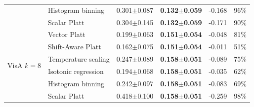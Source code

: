 \begin{table}[pos=t]
\begin{tabular}{llrrrr}
 & Histogram binning & 0.301$\pm$0.087 & \textbf{0.132$\pm$0.059} & -0.168 & 96\% \\
 & Scalar Platt & 0.304$\pm$0.145 & \textbf{0.132$\pm$0.059} & -0.171 & 90\% \\
\midrule
\multirow{6}{*}{VisA $k{=}8$} & Vector Platt & 0.199$\pm$0.063 & \textbf{0.151$\pm$0.054} & -0.048 & 81\% \\
 & Shift-Aware Platt & 0.162$\pm$0.075 & \textbf{0.151$\pm$0.054} & -0.011 & 51\% \\
 & Temperature scaling & 0.247$\pm$0.089 & \textbf{0.158$\pm$0.051} & -0.089 & 75\% \\
 & Isotonic regression & 0.194$\pm$0.068 & \textbf{0.158$\pm$0.051} & -0.035 & 62\% \\
 & Histogram binning & 0.242$\pm$0.097 & \textbf{0.158$\pm$0.051} & -0.083 & 69\% \\
 & Scalar Platt & 0.418$\pm$0.100 & \textbf{0.158$\pm$0.051} & -0.259 & 98\% \\
\bottomrule
\end{tabular}
\end{table}
